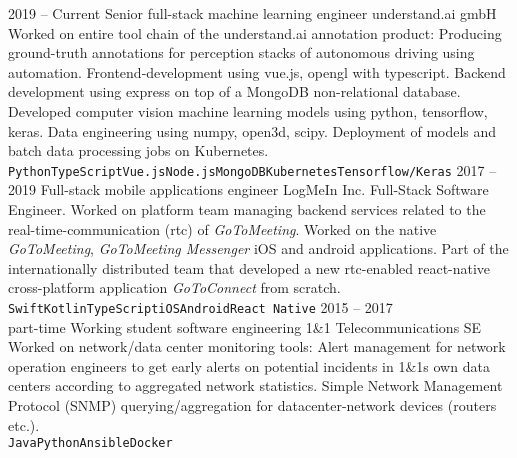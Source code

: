 \documentclass[8pt]{developercv} %
\newcommand{\linebreaksmall}{\vspace{2mm}}
\begin{document}
\begin{entrylist}
	\entry
		{2019 -- Current}
		{Senior full-stack machine learning engineer}
		{understand.ai gmbH}
		{Worked on entire tool chain of the understand.ai annotation product: Producing ground-truth annotations for perception stacks of autonomous driving using automation. Frontend-development using vue.js, opengl with typescript. Backend development using express on top of a MongoDB non-relational database. Developed computer vision machine learning models using python, tensorflow, keras. Data engineering using numpy, open3d, scipy. Deployment of models and batch data processing jobs on Kubernetes.
		\linebreaksmall \\ \texttt{Python}\slashsep\texttt{TypeScript}\slashsep\texttt{Vue.js}\slashsep\texttt{Node.js}\slashsep\texttt{MongoDB}\slashsep\texttt{Kubernetes}\slashsep\texttt{Tensorflow/Keras}} \linebreaksmall
	\entry
		{2017 -- 2019}
		{Full-stack mobile applications engineer}
		{LogMeIn Inc.}
		{Full-Stack Software Engineer. Worked on platform team managing backend services related to the real-time-communication (rtc) of \textit{GoToMeeting}. Worked on the native \textit{GoToMeeting}, \textit{GoToMeeting Messenger} iOS and android applications. Part of the internationally distributed team that developed a new rtc-enabled react-native cross-platform application \textit{GoToConnect} from scratch.
		\linebreaksmall \\ \texttt{Swift}\slashsep\texttt{Kotlin}\slashsep\texttt{TypeScript}\slashsep\texttt{iOS}\slashsep\texttt{Android}\slashsep\texttt{React Native}} \linebreaksmall
	\entry
		{2015 -- 2017\\\footnotesize{part-time}}
		{Working student software engineering}
		{1\&1 Telecommunications SE}
		{Worked on network/data center monitoring tools: Alert management for network operation engineers to get early alerts on potential incidents in 1\&1s own data centers according to aggregated network statistics. Simple Network Management Protocol (SNMP) querying/aggregation for datacenter-network devices (routers etc.).
		\linebreaksmall \\ \texttt{Java}\slashsep\texttt{Python}\slashsep\texttt{Ansible}\slashsep\texttt{Docker}}
\end{entrylist}


\end{document}
